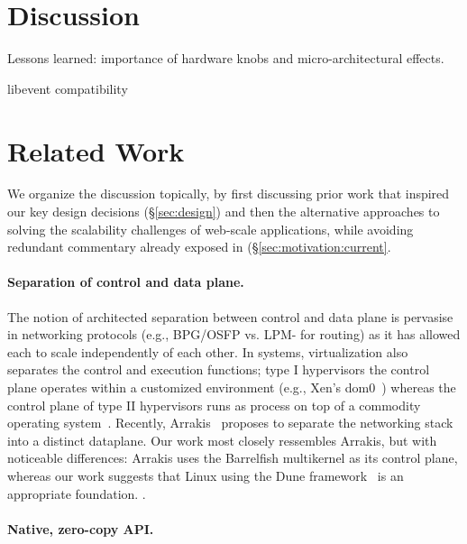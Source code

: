 

\section{Discussion}

\todo Lessons learned: importance of hardware knobs and micro-architectural effects.

\todo libevent compatibility


\section{Related Work}

We organize the discussion topically, by first discussing prior work
that inspired our key design decisions (\S\ref{sec:design}) and then
the alternative approaches to solving the scalability challenges of
web-scale applications, while avoiding redundant commentary already
exposed in (\S\ref{sec:motivation:current}.


\paragraph{Separation of control and data plane.}

The notion of architected separation between control and data plane is
pervasise in networking protocols (e.g., BPG/OSFP vs. LPM- for
routing) as it has allowed each to scale independently of each other.
In systems, virtualization also separates the control and execution
functions; type I hypervisors the control plane operates within a
customized environment (e.g., Xen's
dom0~\cite{DBLP:conf/sosp/BarhamDFHHHN03}) whereas the control plane
of type II hypervisors runs as process on top of a commodity operating
system~\cite{DBLP:journals/tocs/BugnionDRSW12}.  Recently,
Arrakis~\cite{peter2013arrakis,arrakisTR13} proposes to separate the
networking stack into a distinct dataplane.  Our work most closely
ressembles Arrakis, but with noticeable differences: Arrakis uses the
Barrelfish multikernel as its control plane, whereas our work suggests
that Linux using the Dune framework~\cite{belay2012dune} is an
appropriate foundation.  .


\paragraph{Native, zero-copy API.}

